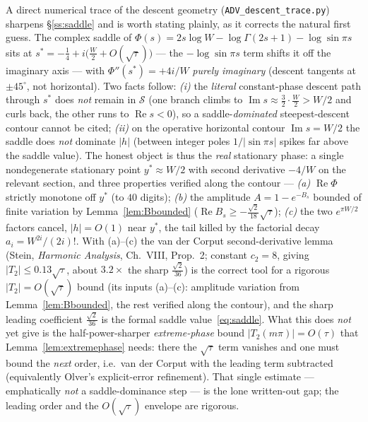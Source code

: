\begin{remark}\label{rem:olverhyp}
A direct numerical trace of the descent geometry (\texttt{ADV\_descent\_trace.py}) sharpens
\S\ref{ss:saddle} and is worth stating plainly, as it corrects the natural first guess. The complex saddle
of $\Phi(s)=2s\log W-\log\Gamma(2s{+}1)-\log\sin\pi s$ sits at $s^\ast=-\tfrac14+i\bigl(\tfrac W2+O(\sqrt\tau)\bigr)$
--- the $-\log\sin\pi s$ term shifts it off the imaginary axis --- with $\Phi''(s^\ast)=+4i/W$ \emph{purely
imaginary} (descent tangents at $\pm45^\circ$, not horizontal). Two facts follow: \emph{(i)} the \emph{literal}
constant-phase descent path through $s^\ast$ does \emph{not} remain in $\mathcal S$ (one branch climbs to
$\operatorname{Im}s\approx\tfrac32\!\cdot\!\tfrac W2>W/2$ and curls back, the other runs to $\operatorname{Re}s<0$),
so a saddle-\emph{dominated} steepest-descent contour cannot be cited; \emph{(ii)} on the operative horizontal
contour $\operatorname{Im}s=W/2$ the saddle does \emph{not} dominate $|h|$ (between integer poles
$1/|\!\sin\pi s|$ spikes far above the saddle value). The honest object is thus the \emph{real} stationary
phase: a single nondegenerate stationary point $y^\ast\approx W/2$ with second derivative $-4/W$ on the
relevant section, and three properties verified along the contour --- \emph{(a)} $\operatorname{Re}\Phi$
strictly monotone off $y^\ast$ (to $40$ digits); \emph{(b)} the amplitude $A=1-e^{-B_s}$ bounded of finite
variation by Lemma~\ref{lem:Bbounded} ($\operatorname{Re}B_s\ge-\tfrac{\sqrt2}{18}\sqrt\tau$); \emph{(c)} the
two $e^{\pi W/2}$ factors cancel, $|h|=O(1)$ near $y^\ast$, the tail killed by the factorial decay
$a_i=W^{2i}/(2i)!$. With (a)--(c) the van der Corput second-derivative lemma (Stein, \emph{Harmonic
Analysis}, Ch.~VIII, Prop.~2; constant $c_2=8$, giving $|T_2|\le0.13\sqrt\tau$, about $3.2\times$ the sharp
$\tfrac{\sqrt2}{36}$) is the correct tool for a rigorous $|T_2|=O(\sqrt\tau)$ bound (its inputs (a)--(c): amplitude variation from
Lemma~\ref{lem:Bbounded}, the rest verified along the contour), and the sharp leading coefficient
$\tfrac{\sqrt2}{36}$ is the formal saddle value~\eqref{eq:saddle}. What this does \emph{not} yet give is the
half-power-sharper \emph{extreme-phase} bound $|T_2(m\pi)|=O(\tau)$ that Lemma~\ref{lem:extremephase} needs:
there the $\sqrt\tau$ term vanishes and one must bound the \emph{next} order, i.e.\ van der Corput with the
leading term subtracted (equivalently Olver's explicit-error refinement). That single estimate --- emphatically
\emph{not} a saddle-dominance step --- is the lone written-out gap; the leading order and the $O(\sqrt\tau)$
envelope are rigorous.
\end{remark}

